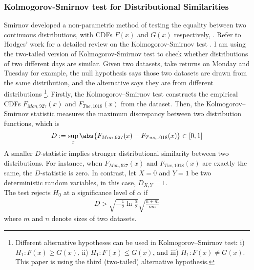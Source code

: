 \documentclass[12pt]{article}
\begin{document}
	\subsubsection{Kolmogorov-Smirnov test for Distributional Similarities}
	\par Smirnov developed a non-parametric method of testing the equality between two continuous distributions, with CDFs $F(x)$ and $G(x)$ respectively, \cite{Smirnov1939}. Refer to Hodges' work for a detailed review on the Kolmogorov-Smirnov test \cite{Hodges1957}. I am using the two-tailed version of Kolmogorov-Smirnov test to check whether distributions of two different days are similar.
	Given two datasets, take returns on Monday and Tuesday for example, the null hypothesis says those two datasets are drawn from the same distribution, and the alternative says they are from different distributions \footnote{Different alternative hypotheses can be used in Kolmogorov–Smirnov test: i) $H_1: F(x) \geq G(x)$, ii) $H_1: F(x) \leq G(x)$, and iii) $H_1: F(x) \neq G(x)$. This paper is using the third (two-tailed) alternative hypothesis.}.
	Firstly, the Kolmogorov–Smirnov test constructs the empirical CDFs $F_{Mon, 927}(x)$ and $F_{Tue, 1018}(x)$ from the dataset. Then, the Kolmogorov–Smirnov statistic measures the maximum discrepancy between two distribution functions, which is
	\begin{align}
		D := \sup_x \abs{F_{Mon, 927}(x) - F_{Tue, 1018}(x)} \in [0, 1]
	\end{align}
	A smaller $D$-statistic implies stronger distributional similarity between two distributions. For instance, when $F_{Mon, 927}(x)$ and $F_{Tue, 1018}(x)$ are exactly the same, the $D$-statistic is zero. In contrast, let $X=0$ and $Y=1$ be two deterministic random variables, in this case, $D_{X, Y} = 1$.\\
	The test rejects $H_0$ at a significance level of $\alpha$ if 
	\begin{align}
		D > \sqrt{-\frac{1}{2} \ln \frac{\alpha}{2}} \sqrt{\frac{n+m}{nm}}
	\end{align}
	where $m$ and $n$ denote sizes of two datasets.
\end{document}
